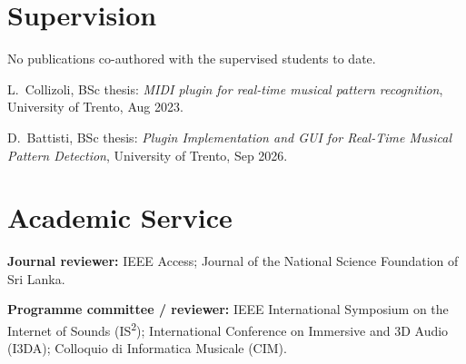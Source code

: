 \documentclass[11pt]{article}
\begin{document}
\section*{Supervision}
{\small No publications co-authored with the supervised students to date.}
\begin{cvlist}
  \item L.\ Collizoli, BSc thesis: \textit{MIDI plugin for real-time musical pattern recognition}, University of Trento, Aug 2023.
  \item D.\ Battisti, BSc thesis: \textit{Plugin Implementation and GUI for Real-Time Musical Pattern Detection}, University of Trento, Sep 2026.
\end{cvlist}

\section*{Academic Service}
\begin{cvlist}
  \item \textbf{Journal reviewer:} IEEE Access; Journal of the National Science Foundation of Sri Lanka.
  \item \textbf{Programme committee / reviewer:} IEEE International Symposium on the Internet of Sounds (IS\textsuperscript{2}); International Conference on Immersive and 3D Audio (I3DA); Colloquio di Informatica Musicale (CIM).
\end{cvlist}
\end{document}
